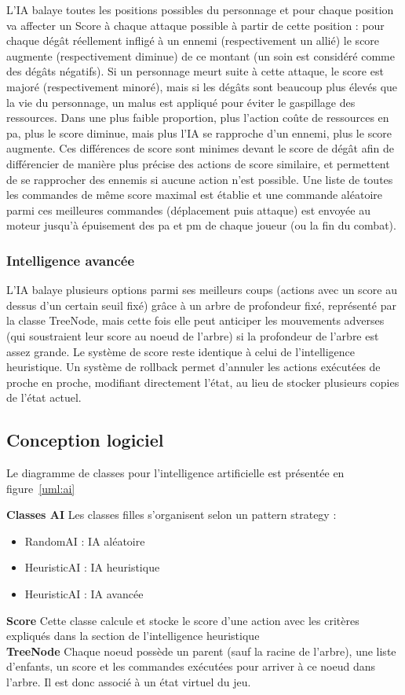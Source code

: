 \documentclass[a4paper,12pt]{article}
\begin{document}
L'IA balaye toutes les positions possibles du personnage et pour chaque position va affecter un Score à chaque attaque possible à partir de cette position : pour chaque dégât réellement infligé à un ennemi (respectivement un allié) le score augmente (respectivement diminue) de ce montant (un soin est considéré comme des dégâts négatifs). Si un personnage meurt suite à cette attaque, le score est majoré (respectivement minoré), mais si les dégâts sont beaucoup plus élevés que la vie du personnage, un malus est appliqué pour éviter le gaspillage des ressources. Dans une plus faible proportion, plus l'action coûte de ressources en pa, plus le score diminue, mais plus l'IA se rapproche d'un ennemi, plus le score augmente. Ces différences de score sont minimes devant le score de dégât afin de différencier de manière plus précise des actions de score similaire, et permettent de se rapprocher des ennemis si aucune action n'est possible.
Une liste de toutes les commandes de même score maximal est établie et une commande aléatoire parmi ces meilleures commandes (déplacement puis attaque) est envoyée au moteur jusqu'à épuisement des pa et pm de chaque joueur (ou la fin du combat).

\subsubsection{Intelligence avancée}

L'IA balaye plusieurs options parmi ses meilleurs coups (actions avec un score au dessus d'un certain seuil fixé) grâce à un arbre de profondeur fixé, représenté par la classe TreeNode, mais cette fois elle peut anticiper les mouvements adverses (qui soustraient leur score au noeud de l'arbre) si la profondeur de l'arbre est assez grande. Le système de score reste identique à celui de l'intelligence heuristique. Un système de rollback permet d'annuler les actions exécutées de proche en proche, modifiant directement l'état, au lieu de stocker plusieurs copies de l'état actuel.

\clearpage
\subsection{Conception logiciel}
Le diagramme de classes pour l'intelligence artificielle est présentée en figure~\ref{uml:ai}

\textbf{Classes AI} Les classes filles s'organisent selon un pattern strategy : 
\begin{itemize}
\item RandomAI : IA aléatoire
\item HeuristicAI : IA heuristique
\item HeuristicAI : IA avancée
\end{itemize}
\textbf{Score} Cette classe calcule et stocke le score d'une action avec les critères expliqués dans la section de l'intelligence heuristique
\\\textbf{TreeNode} Chaque noeud possède un parent (sauf la racine de l'arbre), une liste d'enfants, un score et les commandes exécutées pour arriver à ce noeud dans l'arbre. Il est donc associé à un état virtuel du jeu.
\end{document}
